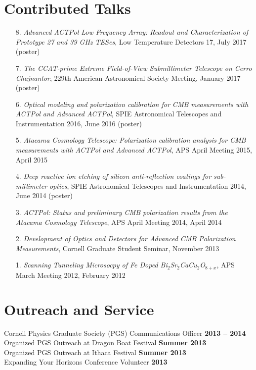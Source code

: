 \documentclass[margin,line]{res}
\begin{document}
\begin{resume}
\section{\sc Contributed Talks} 
\begin{enumerate}
    \item[{8.}] {\it Advanced ACTPol Low Frequency Array: Readout and Characterization of Prototype 27 and 39 GHz TESes}, Low Temperature Detectors 17, July 2017 (poster)
    \item[{7.}] {\it The CCAT-prime Extreme Field-of-View Submillimeter Telescope on Cerro Chajnantor}, 229th American Astronomical Society Meeting, January 2017 (poster)
    \item[{6.}] {\it Optical modeling and polarization calibration for CMB measurements with ACTPol and Advanced ACTPol}, SPIE Astronomical Telescopes and Instrumentation 2016, June 2016 (poster)
    \item[{5.}] {\it Atacama Cosmology Telescope: Polarization calibration analysis for CMB measurements with ACTPol and Advanced ACTPol},
      APS April Meeting 2015, April 2015
    \item[{4.}] {\it Deep reactive ion etching of silicon anti-reflection coatings for sub-millimeter optics},
      SPIE Astronomical Telescopes and Instrumentation 2014, June 2014 (poster)
    \item[{3.}] {\it ACTPol: Status and preliminary CMB polarization results from the Atacama Cosmology Telescope},
      APS April Meeting 2014, April 2014
    \item[{2.}] {\it Development of Optics and Detectors for Advanced CMB Polarization Measurements},
      Cornell Graduate Student Seminar, November 2013
    \item[{1.}] {\it Scanning Tunneling Microsocpy of Fe Doped Bi$_2$Sr$_2$CaCu$_2$O$_{8+x}$},
      APS March Meeting 2012, February 2012
\end{enumerate}

\section{\sc Outreach and Service} 
Cornell Physics Graduate Society (PGS) Communications Officer \hfill \textbf{2013 -- 2014}\\
Organized PGS Outreach at Dragon Boat Festival \hfill \textbf{Summer 2013}\\
Organized PGS Outreach at Ithaca Festival \hfill \textbf{Summer 2013}\\
Expanding Your Horizons Conference Volunteer \hfill \textbf{2013}\\

\end{resume} 
\end{document}
